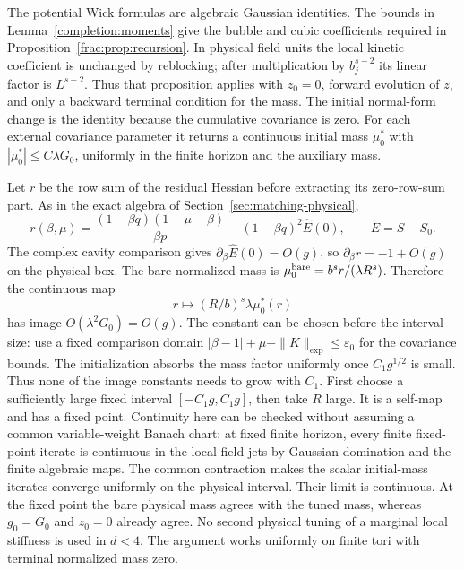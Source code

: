 \documentclass[11pt]{article}
\begin{document}
The potential Wick formulas are algebraic Gaussian identities. The
bounds in Lemma~\ref{completion:moments} give the bubble and cubic
coefficients required in Proposition~\ref{frac:prop:recursion}.
In physical field units the local kinetic coefficient is unchanged
by reblocking; after multiplication by \(b_j^{s-2}\) its linear
factor is \(L^{s-2}\). Thus that proposition applies with \(z_0=0\),
forward evolution of \(z\), and only a backward terminal condition
for the mass. The initial normal-form change is the identity because
the cumulative covariance is zero. For each external covariance
parameter it returns a continuous initial mass
\(\mu_0^*\) with \(|\mu_0^*|\le C\lambda G_0\), uniformly in
the finite horizon and the auxiliary mass.

Let \(r\) be the row sum of the residual Hessian before extracting
its zero-row-sum part. As in the exact algebra of
Section~\ref{sec:matching-physical},
\[
 r(\beta,\mu)
 =\frac{(1-\beta q)(1-\mu-\beta)}{\beta p}
      -(1-\beta q)^2\widehat E(0),\qquad
 E=S-S_0.
\]
The complex cavity comparison gives \(\partial_\beta\widehat E(0)=O(g)\),
so \(\partial_\beta r=-1+O(g)\) on the physical box. The bare
normalized mass is
\(\mu_0^{\rm bare}=b^s r/(\lambda R^s)\). Therefore the continuous map
\[
 r\longmapsto (R/b)^s\lambda\mu_0^*(r)
\]
has image \(O(\lambda^2G_0)=O(g)\). The constant can be chosen
before the interval size: use a fixed comparison domain
\(|\beta-1|+\mu+\|K\|_{\exp}\le\varepsilon_0\) for the covariance
bounds. The initialization absorbs the mass factor uniformly once
\(C_1g^{1/2}\) is small. Thus none of the image constants needs to
grow with \(C_1\). First choose a sufficiently large fixed interval
\([-C_1g,C_1g]\), then take \(R\) large.
It is a self-map and has a fixed point. Continuity here can be checked
without assuming a common variable-weight Banach chart: at fixed finite
horizon, every finite fixed-point iterate is continuous in the local
field jets by Gaussian domination and the finite algebraic maps. The
common contraction makes the scalar initial-mass iterates converge
uniformly on the physical interval. Their limit is continuous. At the fixed point the
bare physical mass agrees with the tuned mass, whereas \(g_0=G_0\)
and \(z_0=0\) already agree. No second physical tuning of a marginal
local stiffness is used in \(d<4\). The argument works uniformly
on finite tori with terminal normalized mass zero.
\end{document}
